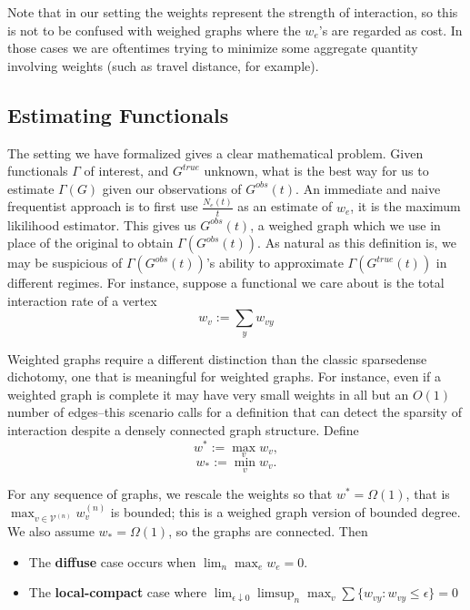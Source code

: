Note that in our setting the weights represent the strength of interaction, so this is not to be confused with weighed graphs where the $w_e$'s are regarded as cost.  In those cases we are oftentimes trying to minimize some aggregate quantity involving weights (such as travel distance, for example).  

\subsection{Estimating Functionals}

The setting we have formalized gives a clear mathematical problem.  Given functionals $\Gamma$ of interest, and $G^{true}$ unknown, what is the best way for us to estimate $\Gamma(G)$ given our observations of $G^{obs}(t)$. An immediate and naive frequentist approach is to first use $\frac{N_e(t)}{t}$ as an estimate of $w_e$, it is the maximum likilihood estimator.  This gives us $G^{obs}(t)$, a weighed graph which we use in place of the original to obtain $\Gamma(G^{obs}(t))$.  As natural as this definition is, we may be suspicious of $\Gamma(G^{obs}(t))$'s ability to approximate $\Gamma(G^{true}(t))$ in different regimes.  For instance, suppose a functional we care about is the total interaction rate of a vertex  $$ w_v := \sum_yw_{vy}$$  

Weighted graphs require a different distinction than the classic sparse\/dense dichotomy, one that is meaningful for weighted graphs.  For instance, even if a weighted graph  is complete it may have very small weights in all but an $O(1)$ number of edges--this scenario calls for a definition that can detect the sparsity of interaction despite a densely connected graph structure.  Define $$ w^* := \max_v w_v,$$ $$ w_*:= \min_v w_v.$$

For any sequence of graphs, we rescale the weights so that $w^* = \Omega(1)$, that is $\max_{v \in \mathcal{V}^{(n)}} w_v^{(n)}$ is bounded; this is a weighed graph version of bounded degree. We also assume $w_* = \Omega(1)$, so the graphs are connected.  Then

\begin{itemize}
    \item The \textbf{ diffuse} case occurs when $\lim_n \max_e w_e = 0$. 
    \item The \textbf{ local-compact} case where $\lim_{\epsilon \downarrow 0} \limsup_n \max_v \sum\{w_{vy}:w_{vy}\leq \epsilon \}=0$
\end{itemize}



